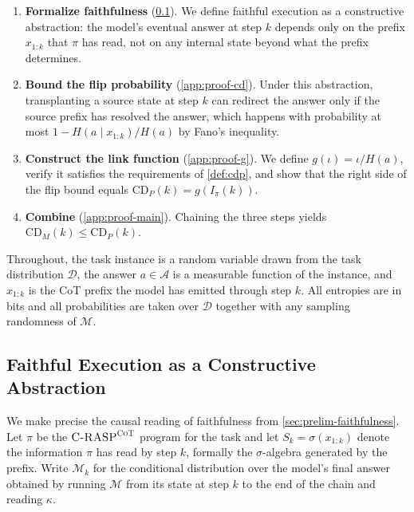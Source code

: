 \documentclass[11pt]{article}
\newcommand{\CDP}{\mathrm{CD}_{P}}
\newcommand{\CDM}{\mathrm{CD}_{M}}
\newcommand{\stepk}{k}
\newcommand{\CRASPCoT}{\textsc{C-RASP}^{\textsc{CoT}}}
\begin{document}
\begin{enumerate}[leftmargin=*,topsep=2pt,itemsep=1pt]
\item \textbf{Formalize faithfulness} (\cref{app:proof-abstraction}). We
  define faithful execution as a constructive abstraction: the model's eventual
  answer at step $\stepk$ depends only on the prefix $x_{1{:}\stepk}$ that $\pi$
  has read, not on any internal state beyond what the prefix determines.
\item \textbf{Bound the flip probability} (\cref{app:proof-cd}). Under this
  abstraction, transplanting a source state at step $\stepk$ can redirect the
  answer only if the source prefix has resolved the answer, which happens with
  probability at most $1-H(a\mid x_{1{:}\stepk})/H(a)$ by Fano's inequality.
\item \textbf{Construct the link function} (\cref{app:proof-g}). We define
  $g(\iota)=\iota/H(a)$, verify it satisfies the requirements of
  \cref{def:cdp}, and show that the right side of the flip bound equals
  $\CDP(\stepk)=g(I_{\pi}(\stepk))$.
\item \textbf{Combine} (\cref{app:proof-main}). Chaining the three steps yields
  $\CDM(\stepk)\le\CDP(\stepk)$.
\end{enumerate}

\noindent Throughout, the task instance is a random variable drawn from the task
distribution $\mathcal{D}$, the answer $a\in\mathcal{A}$ is a measurable
function of the instance, and $x_{1{:}\stepk}$ is the CoT prefix the model has
emitted through step $\stepk$. All entropies are in bits and all probabilities
are taken over $\mathcal{D}$ together with any sampling randomness of
$\mathcal{M}$.

\subsection{Faithful Execution as a Constructive Abstraction}
\label{app:proof-abstraction}

We make precise the causal reading of faithfulness from
\cref{sec:prelim-faithfulness}. Let $\pi$ be the $\CRASPCoT$ program for the
task and let $S_{\stepk}=\sigma\!\left(x_{1{:}\stepk}\right)$ denote the
information $\pi$ has read by step $\stepk$, formally the $\sigma$-algebra
generated by the prefix. Write $\mathcal{M}_{\stepk}$ for the conditional
distribution over the model's final answer obtained by running $\mathcal{M}$
from its state at step $\stepk$ to the end of the chain and reading $\kappa$.
\end{document}

